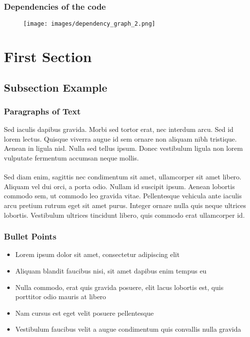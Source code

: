 \documentclass{beamer}
\begin{document}
\begin{frame}
  \frametitle{Dependencies of the code}
  \begin{figure}
  \texttt{[image: images/dependency\_graph\_2.png]}
  \end{figure}
\end{frame}

\iffalse
\section{First Section} %

\subsection{Subsection Example} %

\begin{frame}
\frametitle{Paragraphs of Text}
Sed iaculis dapibus gravida. Morbi sed tortor erat, nec interdum arcu. Sed id lorem lectus. Quisque viverra augue id sem ornare non aliquam nibh tristique. Aenean in ligula nisl. Nulla sed tellus ipsum. Donec vestibulum ligula non lorem vulputate fermentum accumsan neque mollis.\\~\\

Sed diam enim, sagittis nec condimentum sit amet, ullamcorper sit amet libero. Aliquam vel dui orci, a porta odio. Nullam id suscipit ipsum. Aenean lobortis commodo sem, ut commodo leo gravida vitae. Pellentesque vehicula ante iaculis arcu pretium rutrum eget sit amet purus. Integer ornare nulla quis neque ultrices lobortis. Vestibulum ultrices tincidunt libero, quis commodo erat ullamcorper id.
\end{frame}


\begin{frame}
\frametitle{Bullet Points}
\begin{itemize}
\item Lorem ipsum dolor sit amet, consectetur adipiscing elit
\item Aliquam blandit faucibus nisi, sit amet dapibus enim tempus eu
\item Nulla commodo, erat quis gravida posuere, elit lacus lobortis est, quis porttitor odio mauris at libero
\item Nam cursus est eget velit posuere pellentesque
\item Vestibulum faucibus velit a augue condimentum quis convallis nulla gravida
\end{itemize}
\end{frame}
\end{document}
